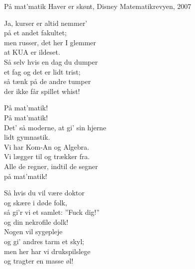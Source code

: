 \begin{song}{På mat'matik}
  {} %
  {Haver er skønt, Disney} %
  {} %
  {Matematikrevyen, 2007} %
  {\NotCCLIed} %

  \begin{SBVerse}
    Ja, kurser er altid nemmer’\\
    på et andet fakultet;\\
    men russer, det her I glemmer\\
    at KUA er ildeset.\\\medskip
    Så selv hvis en dag du dumper\\
    et fag og det er lidt trist;\\
    så tænk på de andre tumper\\
    der ikke får spillet whist!
  \end{SBVerse}

  \begin{SBChorus}
    På mat’matik!\\
    På mat’matik!\\
    Det’ så moderne, at gi’ sin hjerne\\
    lidt gymnastik.\\\medskip
    Vi har Kom-An og Algebra.\\
    Vi lægger til og trækker fra.\\
    Alle de regner, indtil de segner\\
    på mat’matik!
  \end{SBChorus}

  \begin{SBVerse}
    Så hvis du vil være doktor\\
    og skære i døde folk,\\
    så gi’r vi et samlet: ”Fuck dig!”\\
    og din nekrofile dolk!\\\medskip
    Nogen vil sygepleje\\
    og gi’ andres tarm et skyl;\\
    men her har vi drukspilslege\\
    og tragter en masse øl!
  \end{SBVerse}


\end{song}
